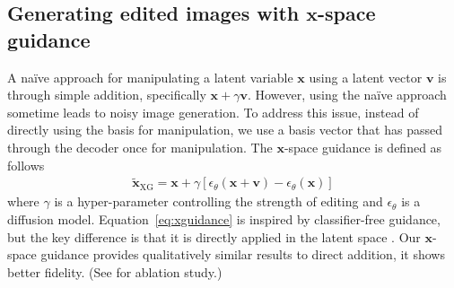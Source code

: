 



\subsection{{Generating edited images with $\mathbf{x}$-space guidance}}
{A na\"ive approach for manipulating a latent variable $\mathbf{x}$ using a latent vector $\mathbf{v}$ is through simple addition, specifically $\mathbf{x}+\gamma\mathbf{v}$.
However, using the na\"ive approach sometime leads to noisy image generation.
To address this issue, instead of directly using the basis for manipulation, we use a basis vector that has passed through the decoder once for manipulation.
}
The $\mathbf{x}$-space guidance is defined as follows
\begin{align}
\label{eq:xguidance}
    \tilde{\mathbf{x}}_{\text{XG}} = \mathbf{x} + \gamma[\epsilon_{\theta}(\mathbf{x}+\mathbf{v}) - \epsilon_{\theta}(\mathbf{x})]
\end{align}
where $\gamma$ is a hyper-parameter controlling the strength of editing and $\epsilon_{\theta}$ is a diffusion model. 
Equation~\ref{eq:xguidance} is inspired by classifier-free guidance, but the key difference is that it is directly applied in the latent space \exspace{}.
{Our $\mathbf{x}$-space guidance provides qualitatively similar results to direct addition, 
 it shows better fidelity. (See  for ablation study.)}

